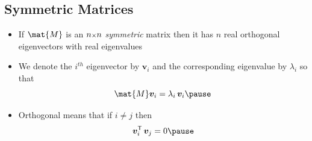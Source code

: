 \documentclass[25pt,landscape,footrule]{foils}
\begin{document}

\begin{slide}
\section{Symmetric Matrices}

\begin{PauseHighLight}
  \begin{itemize}
  \item If $\mat{M}$ is an $n{\scriptstyle \times} n$ \emph{symmetric} matrix then it has
    $n$ real orthogonal eigenvectors with real eigenvalues\pause
  \item We denote the $i^{th}$ eigenvector by $\bm{v}_i$ and the
    corresponding eigenvalue by $\lambda_i$ so that
    \begin{displaymath}
      \mat{M} \bm{v}_i = \lambda_i \, \bm{v}_i \pause
    \end{displaymath}
  \item Orthogonal means that if $i\neq j$ then
    \begin{displaymath}
      \bm{v}_i^\tr \, \bm{v}_j = 0\pause
  \end{displaymath}

  \end{itemize}
\end{PauseHighLight}

\end{slide}


\end{document}
